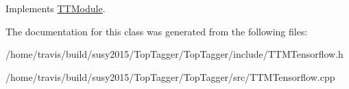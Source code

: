 Implements \hyperlink{classTTModule_a14e7c03fbf4ee1a5008c9344adc7c896}{T\-T\-Module}.



The documentation for this class was generated from the following files\-:\begin{DoxyCompactItemize}
\item 
/home/travis/build/susy2015/\-Top\-Tagger/\-Top\-Tagger/include/T\-T\-M\-Tensorflow.\-h\item 
/home/travis/build/susy2015/\-Top\-Tagger/\-Top\-Tagger/src/T\-T\-M\-Tensorflow.\-cpp\end{DoxyCompactItemize}

